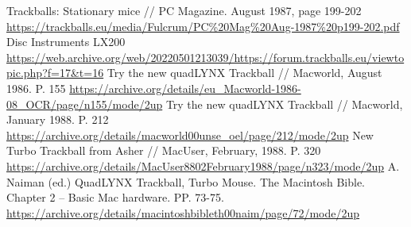 \documentclass[11pt, a4paper]{article}
\begin{document}
\begin{thebibliography}{9}
 Trackballs: Stationary mice // PC Magazine. August 1987, page 199-202 \url{https://trackballs.eu/media/Fulcrum/PC%20Mag%20Aug-1987%20p199-202.pdf}
 Disc Instruments LX200 \url{https://web.archive.org/web/20220501213039/https://forum.trackballs.eu/viewtopic.php?f=17&t=16}
 Try the new quadLYNX Trackball // Macworld, August 1986. P. 155  \url{https://archive.org/details/eu_Macworld-1986-08_OCR/page/n155/mode/2up}
 Try the new quadLYNX Trackball // Macworld, January 1988. P. 212 \url{https://archive.org/details/macworld00unse_oel/page/212/mode/2up}
 New Turbo Trackball from Asher // MacUser, February, 1988. P. 320 
\url{https://archive.org/details/MacUser8802February1988/page/n323/mode/2up}
 A. Naiman (ed.) QuadLYNX Trackball, Turbo Mouse. The Macintosh Bible. Chapter 2 -- Basic Mac hardware. PP. 73-75. \url{https://archive.org/details/macintoshbibleth00naim/page/72/mode/2up}
\end{thebibliography}
\end{document}
